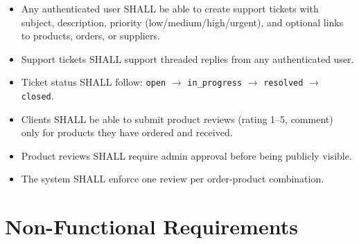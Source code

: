 \documentclass[12pt,a4paper]{report}
\begin{document}
\begin{tcolorbox}[reqbox,title={FR-SUPPORT: Support and Review Requirements}]
\begin{itemize}[leftmargin=1.5em]
  \item {} Any authenticated user SHALL be able to create support tickets with subject, description, priority (low/medium/high/urgent), and optional links to products, orders, or suppliers.
  \item {} Support tickets SHALL support threaded replies from any authenticated user.
  \item {} Ticket status SHALL follow: \texttt{open} $\to$ \texttt{in\_progress} $\to$ \texttt{resolved} $\to$ \texttt{closed}.
  \item {} Clients SHALL be able to submit product reviews (rating 1--5, comment) only for products they have ordered and received.
  \item {} Product reviews SHALL require admin approval before being publicly visible.
  \item {} The system SHALL enforce one review per order-product combination.
\end{itemize}
\end{tcolorbox}

\section{Non-Functional Requirements}
\end{document}
